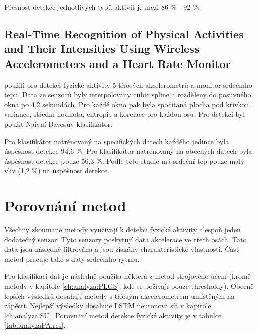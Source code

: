 Přesnost detekce jednotlivých typů aktivit je mezi 86 \% - 92 \%.


\subsection{Real-Time Recognition of Physical Activities and Their Intensities Using
Wireless Accelerometers and a Heart Rate Monitor}
\label{ch:analyza:NoDiabetes}

\citet{analyzaPA.NoDiabetes} použili pro detekci fyzické aktivity 5 tříosých akcelerometrů a monitor srdečního tepu. Data ze senzorů byly interpolovány cubic spline a rozděleny do posuvného okna po 4,2 sekundách. Pro každé okno pak byla spočítaná plocha pod křivkou, variance, střední hodnota, entropie a korelace pro každou osu. Pro detekci byl použit Naivní Bayesův klasifikátor.

Pro klasifikátor natrénovaný na specifických datech každého jedince byla úspěšnost detekce 94,6 \%. Pro klasifikátor natrénovaný na obecných datech byla úspěšnost detekce pouze 56,3 \%. Podle této studie má srdeční tep pouze malý vliv (1,2 \%) na úspěšnost detekce.




\section{Porovnání metod}

Všechny zkoumané metody využívají k detekci fyzické aktivity alespoň jeden dodatečný senzor. Tyto senzory poskytují data akcelerace ve třech osách. Tato data jsou následně filtrována a jsou získány charakteristické vlastnosti. Část metod pracuje také s daty srdečního rytmu.

Pro klasifikaci dat je následně použita některá z metod strojového učení (kromě metody v kapitole \ref{ch:analyza:PLGS}, kde se požívají pouze thresholdy). Obecně lepších výsledků dosahují metody s tříosým akcelerometrem umístěným na zápěstí. Nejlepší výsledky dosahuje LSTM neuronová síť v kapitole \ref{ch:analyza:SU}. Porovnání metod detekce fyzické aktivity je v tabulce \ref{tab:analyzaPA:res}.

